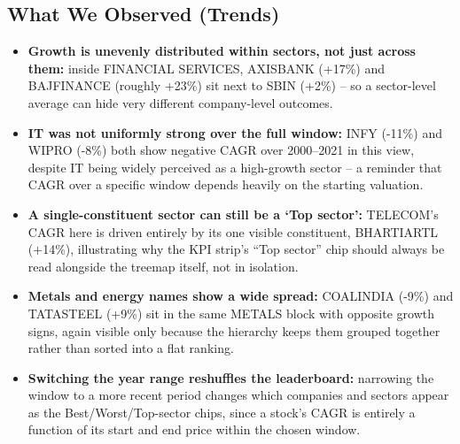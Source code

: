 \documentclass[14pt,a4paper]{extreport}
\begin{document}
\subsection{What We Observed (Trends)}
\begin{itemize}
    \item \textbf{Growth is unevenly distributed within sectors, not just
        across them:} inside FINANCIAL SERVICES, AXISBANK (+17\%) and
        BAJFINANCE (roughly +23\%) sit next to SBIN (+2\%) -- so a
        sector-level average can hide very different company-level
        outcomes.
    \item \textbf{IT was not uniformly strong over the full window:} INFY
        (-11\%) and WIPRO (-8\%) both show negative CAGR over 2000--2021
        in this view, despite IT being widely perceived as a
        high-growth sector -- a reminder that CAGR over a specific window
        depends heavily on the starting valuation.
    \item \textbf{A single-constituent sector can still be a `Top
        sector':} TELECOM's CAGR here is driven entirely by its one
        visible constituent, BHARTIARTL (+14\%), illustrating why the KPI
        strip's ``Top sector'' chip should always be read alongside the
        treemap itself, not in isolation.
    \item \textbf{Metals and energy names show a wide spread:} COALINDIA
        (-9\%) and TATASTEEL (+9\%) sit in the same METALS block with
        opposite growth signs, again visible only because the hierarchy
        keeps them grouped together rather than sorted into a flat
        ranking.
    \item \textbf{Switching the year range reshuffles the leaderboard:}
        narrowing the window to a more recent period changes which
        companies and sectors appear as the Best/Worst/Top-sector chips,
        since a stock's CAGR is entirely a function of its start and end
        price within the chosen window.
\end{itemize}
\end{document}
